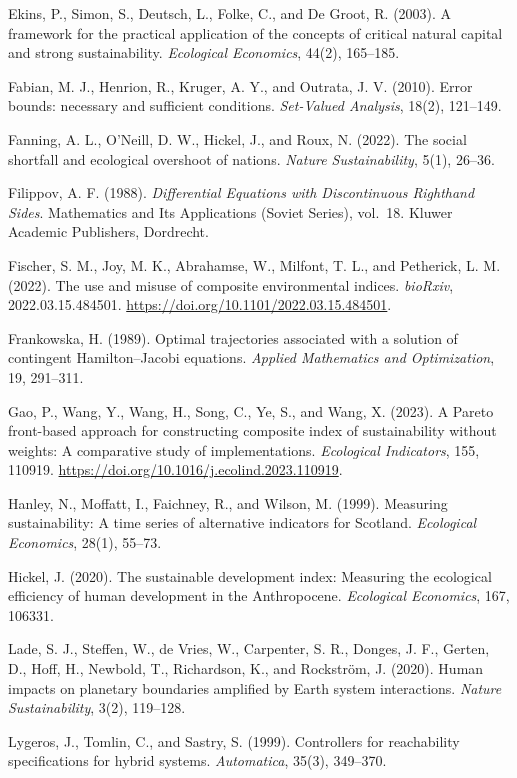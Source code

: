 \documentclass[3p,11pt]{elsarticle}
\begin{document}
Ekins, P., Simon, S., Deutsch, L., Folke, C., and De Groot, R. (2003). A
framework for the practical application of the concepts of critical
natural capital and strong sustainability. \emph{Ecological Economics},
44(2), 165--185.

Fabian, M. J., Henrion, R., Kruger, A. Y., and Outrata, J. V. (2010). Error bounds: necessary and sufficient conditions. \emph{Set-Valued Analysis}, 18(2), 121--149.

Fanning, A. L., O'Neill, D. W., Hickel, J., and Roux, N. (2022). The social shortfall and ecological overshoot of nations. \emph{Nature Sustainability}, 5(1), 26--36.

Filippov, A. F. (1988). \emph{Differential Equations with Discontinuous Righthand Sides}. Mathematics and Its Applications (Soviet Series), vol.~18. Kluwer Academic Publishers, Dordrecht.

Fischer, S. M., Joy, M. K., Abrahamse, W., Milfont, T. L., and Petherick, L. M. (2022). The use and misuse of composite environmental indices. \emph{bioRxiv}, 2022.03.15.484501. \url{https://doi.org/10.1101/2022.03.15.484501}.

Frankowska, H. (1989). Optimal trajectories associated with a solution
of contingent Hamilton--Jacobi equations. \emph{Applied Mathematics and
Optimization}, 19, 291--311.

Gao, P., Wang, Y., Wang, H., Song, C., Ye, S., and Wang, X. (2023). A Pareto front-based approach for constructing composite index of sustainability without weights: A comparative study of implementations. \emph{Ecological Indicators}, 155, 110919. \url{https://doi.org/10.1016/j.ecolind.2023.110919}.

Hanley, N., Moffatt, I., Faichney, R., and Wilson, M. (1999). Measuring
sustainability: A time series of alternative indicators for Scotland.
\emph{Ecological Economics}, 28(1), 55--73.

Hickel, J. (2020). The sustainable development index: Measuring the
ecological efficiency of human development in the Anthropocene.
\emph{Ecological Economics}, 167, 106331.

Lade, S. J., Steffen, W., de Vries, W., Carpenter, S. R., Donges, J. F., Gerten, D., Hoff, H., Newbold, T., Richardson, K., and Rockstr\"om, J. (2020). Human impacts on planetary boundaries amplified by Earth system interactions. \emph{Nature Sustainability}, 3(2), 119--128.

Lygeros, J., Tomlin, C., and Sastry, S. (1999). Controllers for
reachability specifications for hybrid systems. \emph{Automatica},
35(3), 349--370.
\end{document}
